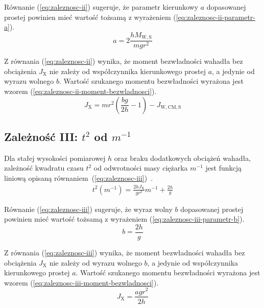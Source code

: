 \documentclass[twocolumn, a4paper, polish, 10pt]{article}
\newcommand{\JX}{\ensuremath{ J_{\mathrm{X}} }}
\newcommand{\JwCmS}{\ensuremath{ J_{\mathrm{W,CM,S}} }}
\newcommand{\MWS}{\ensuremath{ M_{\mathrm{W,S}} }}
\begin{document}
Równanie (\ref{eq:zaleznosc-ii}) sugeruje, że parametr kierunkowy $a$ dopasowanej prostej powinien mieć wartość tożsamą z wyrażeniem (\ref{eq:zaleznosc-ii-parametr-a}).
\begin{equation}
    a = 2 \frac{h \MWS}{m g r^2}
\label{eq:zaleznosc-ii-parametr-a}
\end{equation}

Z równania (\ref{eq:zaleznosc-ii}) wynika, że moment bezwładności wahadła bez obciążenia $\JX$ nie zależy od współczynnika kierunkowego prostej $a$, a jedynie od wyrazu wolnego $b$. Wartość szukanego momentu bezwładności wyrażona jest wzorem (\ref{eq:zaleznosc-ii-moment-bezwladnosci}).
\begin{equation}
    \JX = m r^2 \left( \frac{b g}{2h} - 1 \right) - \JwCmS
\label{eq:zaleznosc-ii-moment-bezwladnosci}
\end{equation}

\subsection{Zależność III: \texorpdfstring{$t^2$}{t²} od \texorpdfstring{$m^{-1}$}{1/m}}
Dla stałej wysokości pomiarowej $h$ oraz braku dodatkowych obciążeń wahadła, zależność kwadratu czasu $t^2$ od odwrotności masy ciężarka $m^{-1}$ jest funkcją liniową opisaną równaniem~(\ref{eq:zaleznosc-iii})~\cite{pracownia-fizyczna-m7}.
\begin{equation}
\begin{split}
    t^2(m^{-1}) 
    = \frac{2 h \JX}{g r^2} m^{-1}
    + \frac{2h}{g}
\label{eq:zaleznosc-iii}
\end{split}
\end{equation}

Równanie (\ref{eq:zaleznosc-iii}) sugeruje, że wyraz wolny $b$ dopasowanej prostej powinien mieć wartość tożsamą z wyrażeniem (\ref{eq:zaleznosc-iii-parametr-b}).
\begin{equation}
    b = \frac{2h}{g}
\label{eq:zaleznosc-iii-parametr-b}
\end{equation}

Z równania (\ref{eq:zaleznosc-iii}) wynika, że moment bezwładności wahadła bez obciążenia $\JX$ nie zależy od wyrazu wolnego $b$, a jedynie od współczynnika kierunkowego prostej $a$. Wartość szukanego momentu bezwładności wyrażona jest wzorem (\ref{eq:zaleznosc-iii-moment-bezwladnosci}).
\begin{equation}
    \JX = \frac{a g r^2}{2h}
\label{eq:zaleznosc-iii-moment-bezwladnosci}
\end{equation}
\end{document}
